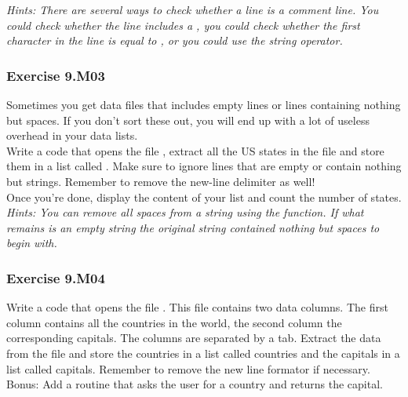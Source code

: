 \textit{Hints:
There are several ways to check whether a line is a comment line. You could check whether
the line includes a {\code{\#}}, you could check whether the first character in the line is equal to {\code{\#}}, or you could use the {} string operator.}\\[1cm]


\subsubsection*{Exercise 9.M03}
Sometimes you get data files that includes empty lines or lines containing nothing but
spaces. If you don’t sort these out, you will end up with a lot of useless overhead in your
data lists.\\
Write a code that opens the file {}, extract all the US states in the file and store them in a list called {}. Make sure to ignore lines that are empty or contain nothing but strings. Remember to remove the new-line delimiter as well!\\
Once you’re done, display the content of your list and count the number of states.\\


\textit{Hints:
You can remove all spaces from a string using the {} function. If what remains is an empty string the original string contained nothing but spaces to begin with.}\\[1cm]


\subsubsection*{Exercise 9.M04}
Write a code that opens the file {}. This file contains two data columns. The first column contains all the countries in the world, the second column
the corresponding capitals. The columns are separated by a tab. Extract the data from the
file and store the countries in a list called countries and the capitals in a list called
capitals. Remember to remove the new line formator {} if necessary.\\
Bonus:
Add a routine that asks the user for a country and returns the capital.\\


